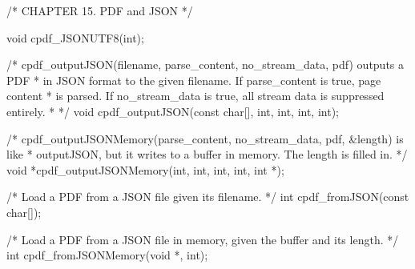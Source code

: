 /* CHAPTER 15. PDF and JSON */

void cpdf_JSONUTF8(int);

/* cpdf_outputJSON(filename, parse_content, no_stream_data, pdf) outputs a PDF
 * in JSON format to the given filename. If parse_content is true, page content
 * is parsed. If no_stream_data is true, all stream data is suppressed entirely.
 * */
void cpdf_outputJSON(const char[], int, int, int, int);

/* cpdf_outputJSONMemory(parse_content, no_stream_data, pdf, &length) is like
 * outputJSON, but it writes to a buffer in memory. The length is filled in. */
void *cpdf_outputJSONMemory(int, int, int, int, int *);

/* Load a PDF from a JSON file given its filename. */
int cpdf_fromJSON(const char[]);

/* Load a PDF from a JSON file in memory, given the buffer and its length. */
int cpdf_fromJSONMemory(void *, int);


